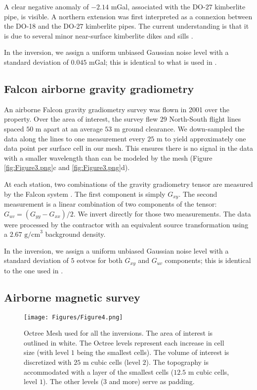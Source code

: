 \documentclass[paper, twocolumn]{geophysics} %
\begin{document}
A clear negative anomaly of $-2.14$ mGal, associated with the DO-$27$ kimberlite pipe, is visible. A northern extension was first interpreted as a connexion between the DO-18 and the DO-$27$ kimberlite pipes. The current understanding is that it is due to several minor near-surface kimberlite dikes and sills \citep{Doyle}.

In the inversion, we assign a uniform unbiased Gaussian noise level with a standard deviation of $0.045$ mGal; this is identical to what is used in \citet{TKCpaper}.

\subsection{Falcon airborne gravity gradiometry}

An airborne Falcon gravity gradiometry survey was flown in 2001 over the property. Over the area of interest, the survey flew $29$ North-South flight lines spaced $50$ m apart at an average $53$ m ground clearance. We down-sampled the data along the lines to one measurement every $25$ m to yield approximately one data point per surface cell in our mesh. This ensures there is no signal in the data with a smaller wavelength than can be modeled by the mesh (Figure \ref{fig:Figure3.png}c and \ref{fig:Figure3.png}d).

At each station, two combinations of the gravity gradiometry tensor \citep{GG} are measured by the Falcon system \citep{FalconPaper}. The first component is simply $G_{xy}$. The second measurement is a linear combination of two components of the tensor: $G_{uv} = (G_{yy}-G_{xx}) / 2$. We invert directly for those two measurements. The data were processed by the contractor with an equivalent source transformation using a $2.67 \text{ g/cm}^3$ background density.

In the inversion, we assign a uniform unbiased Gaussian noise level with a standard deviation of $5$ eotvos for both $G_{xy}$ and $G_{uv}$ components; this is identical to the one used in \citet{TKCpaper}.

\subsection{Airborne magnetic survey}


\begin{figure*}
\centering
\texttt{[image: Figures/Figure4.png]}
\caption{Octree Mesh used for all the inversions. The area of interest is outlined in white. The Octree levels represent each increase in cell size (with level $1$ being the smallest cells). The volume of interest is discretized with $25$ m cubic cells (level $2$). The topography is accommodated with a layer of the smallest cells ($12.5$ m cubic cells, level $1$). The other levels ($3$ and more) serve as padding.}
\label{fig:Figure4.png}
\end{figure*}
\end{document}
